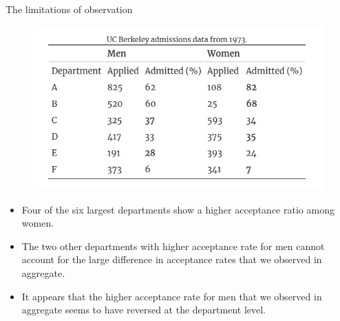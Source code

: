 \documentclass[handout]{beamer}
\begin{document}
\begin{frame}{The limitations of observation}
\scriptsize{
\begin{figure}[h!]
	\centering
	\includegraphics[scale=0.4]{pics/berkley.png}
\end{figure}

\begin{itemize}

\item Four of the six largest departments show a higher acceptance ratio among women.
\item The two other departments with higher acceptance rate for men cannot account for the large difference in acceptance rates that we observed in aggregate. 
\item It appears that the higher acceptance rate for men that we observed in aggregate seems to have reversed at the department level.


\end{itemize}

} 

\end{frame}
\end{document}
